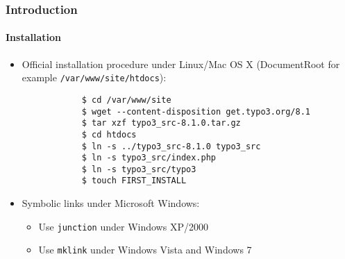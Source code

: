 \begin{frame}[fragile]
	\frametitle{Introduction}
	\framesubtitle{Installation}

	\begin{itemize}
		\item Official installation procedure under Linux/Mac OS X\newline
			(DocumentRoot for example \texttt{/var/www/site/htdocs}):
		\begin{lstlisting}
			$ cd /var/www/site
			$ wget --content-disposition get.typo3.org/8.1
			$ tar xzf typo3_src-8.1.0.tar.gz
			$ cd htdocs
			$ ln -s ../typo3_src-8.1.0 typo3_src
			$ ln -s typo3_src/index.php
			$ ln -s typo3_src/typo3
			$ touch FIRST_INSTALL
		\end{lstlisting}

		\item Symbolic links under Microsoft Windows:

			\begin{itemize}
				\item Use \texttt{junction} under Windows XP/2000
				\item Use \texttt{mklink} under Windows Vista and Windows 7
			\end{itemize}

	\end{itemize}
\end{frame}

